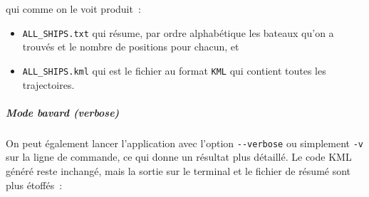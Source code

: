 qui comme on le voit produit~:

\begin{itemize}
\tightlist
\item
  \texttt{ALL\_SHIPS.txt} qui résume, par ordre alphabétique les bateaux
  qu'on a trouvés et le nombre de positions pour chacun, et
\item
  \texttt{ALL\_SHIPS.kml} qui est le fichier au format \texttt{KML} qui
  contient toutes les trajectoires.
\end{itemize}

    \hypertarget{mode-bavard-verbose}{%
\subparagraph{Mode bavard (verbose)}\label{mode-bavard-verbose}}

    On peut également lancer l'application avec l'option
\texttt{-\/-verbose} ou simplement \texttt{-v} sur la ligne de commande,
ce qui donne un résultat plus détaillé. Le code KML généré reste
inchangé, mais la sortie sur le terminal et le fichier de résumé sont
plus étoffés~:

\begin{Shaded}
\begin{Highlighting}[frame=lines,framerule=0.6mm,rulecolor=\color{asisframecolor}]
\OperatorTok{--}\OperatorTok{/*}
\OperatorTok{/}\OperatorTok{--}\OperatorTok{=}\OperatorTok{--}
\OperatorTok{/}\OperatorTok{--}\OperatorTok{=}
\OperatorTok{/}\OperatorTok{--}\OperatorTok{=}
\OperatorTok{/}\OperatorTok{--}\OperatorTok{=}
\OperatorTok{-}
\OperatorTok{-}\OperatorTok{-}\OperatorTok{->}
\OperatorTok{->}
\end{Highlighting}
\end{Shaded}


